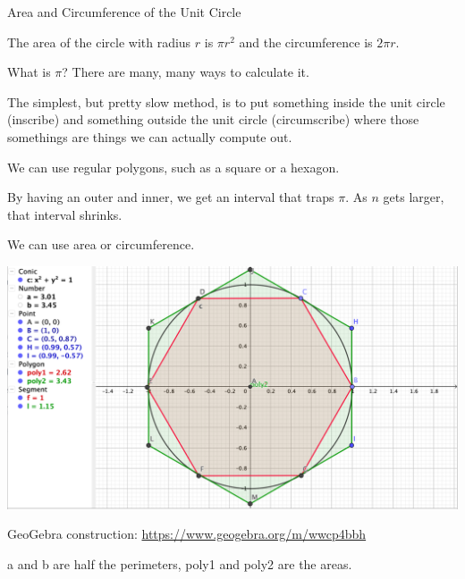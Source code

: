 \documentclass{beamer}
\begin{document}
\begin{frame}{Area and Circumference of the Unit Circle}
    
    The area of the circle with radius $r$ is $\pi r^2$ and the circumference is $2 \pi r$.

    What is $\pi$?  There are many, many ways to calculate it. 

    The simplest, but pretty slow method, is to put something inside the unit circle (inscribe) and something outside the unit circle (circumscribe) where those somethings are things we can actually compute out. 

    We can use regular polygons, such as a square or a hexagon. 

    By having an outer and inner, we get an interval that traps $\pi$. As $n$ gets larger, that interval shrinks. 

    We can use area or circumference. 
    
\end{frame}


\begin{frame}

    \includegraphics[width=\textwidth]{Images/hexagon-circle.png}

  GeoGebra construction:  \url{https://www.geogebra.org/m/wwcp4bbh}
  
  a and b are half the perimeters, poly1 and poly2 are the areas.
\end{frame}
\end{document}
